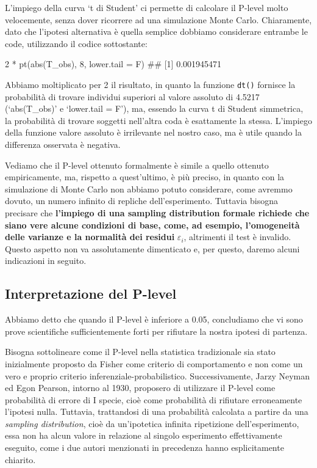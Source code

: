 \documentclass[a4paper,12pt,oneside]{book}
\newenvironment{Shaded}{\begin{snugshade}}{\end{snugshade}}
\newcommand{\DecValTok}[1]{#1}
\newcommand{\SpecialCharTok}[1]{#1}
\newcommand{\DocumentationTok}[1]{#1}
\newcommand{\FunctionTok}[1]{#1}
\newcommand{\AttributeTok}[1]{#1}
\newcommand{\NormalTok}[1]{#1}
\begin{document}
L'impiego della curva `t di Student' ci permette di calcolare il P-level molto velocemente, senza dover ricorrere ad una simulazione Monte Carlo. Chiaramente, dato che l'ipotesi alternativa è quella semplice dobbiamo considerare entrambe le code, utilizzando il codice sottostante:

\begin{Shaded}
\begin{Highlighting}[]
\DecValTok{2} \SpecialCharTok{*} \FunctionTok{pt}\NormalTok{(}\FunctionTok{abs}\NormalTok{(T\_obs), }\DecValTok{8}\NormalTok{, }\AttributeTok{lower.tail =}\NormalTok{ F) }
\DocumentationTok{\#\# [1] 0.001945471}
\end{Highlighting}
\end{Shaded}

Abbiamo moltiplicato per 2 il risultato, in quanto la funzione \texttt{dt()} fornisce la probabilità di trovare individui superiori al valore assoluto di 4.5217 (`abs(T\_obs)' e `lower.tail = F'), ma, essendo la curva t di Student simmetrica, la probabilità di trovare soggetti nell'altra coda è esattamente la stessa. L'impiego della funzione valore assoluto è irrilevante nel nostro caso, ma è utile quando la differenza osservata è negativa.

Vediamo che il P-level ottenuto formalmente è simile a quello ottenuto empiricamente, ma, rispetto a quest'ultimo, è più preciso, in quanto con la simulazione di Monte Carlo non abbiamo potuto considerare, come avremmo dovuto, un numero infinito di repliche dell'esperimento. Tuttavia bisogna precisare che \textbf{l'impiego di una sampling distribution formale richiede che siano vere alcune condizioni di base, come, ad esempio, l'omogeneità delle varianze e la normalità dei residui} \(\varepsilon_i\), altrimenti il test è invalido. Questo aspetto non va assolutamente dimenticato e, per questo, daremo alcuni indicazioni in seguito.

\hypertarget{interpretazione-del-p-level}{%
\subsection{Interpretazione del P-level}\label{interpretazione-del-p-level}}

Abbiamo detto che quando il P-level è inferiore a 0.05, concludiamo che vi sono prove scientifiche sufficientemente forti per rifiutare la nostra ipotesi di partenza.

Bisogna sottolineare come il P-level nella statistica tradizionale sia stato inizialmente proposto da Fisher come criterio di comportamento e non come un vero e proprio criterio inferenziale-probabilistico. Successivamente, Jarzy Neyman ed Egon Pearson, intorno al 1930, proposero di utilizzare il P-level come probabilità di errore di I specie, cioè come probabilità di rifiutare erroneamente l'ipotesi nulla. Tuttavia, trattandosi di una probabilità calcolata a partire da una \emph{sampling distribution}, cioè da un'ipotetica infinita ripetizione dell'esperimento, essa non ha alcun valore in relazione al singolo esperimento effettivamente eseguito, come i due autori menzionati in precedenza hanno esplicitamente chiarito.
\end{document}
